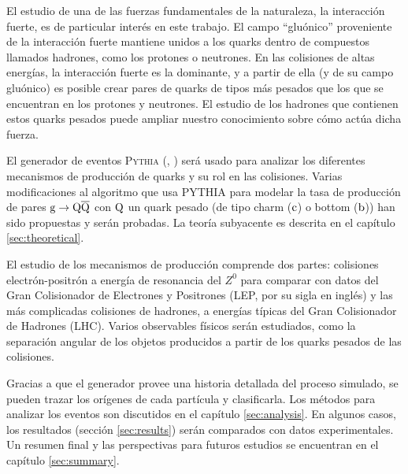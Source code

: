 El estudio de una de las fuerzas fundamentales de la naturaleza, la interacción fuerte, es de particular interés en este trabajo. El campo ``gluónico'' proveniente de la interacción fuerte mantiene unidos a los quarks dentro de compuestos llamados hadrones, como los protones o neutrones. En las colisiones de altas energías, la interacción fuerte es la dominante, y a partir de ella (y de su campo gluónico) es posible crear pares de quarks de tipos más pesados que los que se encuentran en los protones y neutrones. El estudio de los hadrones que contienen estos quarks pesados puede ampliar nuestro conocimiento sobre cómo actúa dicha fuerza.

El generador de eventos \textsc{Pythia} (\cite{Sjostrand:2006za}, \cite{Sjostrand:2007gs}) será usado para analizar los diferentes mecanismos de producción de quarks y su rol en las colisiones. Varias modificaciones al algoritmo que usa PYTHIA para modelar la tasa de producción de pares ${\mathrm g}\to{\mathrm Q}\overline{\mathrm Q}$ con ${\mathrm Q}$ un quark pesado (de tipo charm (${\mathrm c}$) o bottom (${\mathrm b}$)) han sido propuestas y serán probadas. La teoría subyacente es descrita en el capítulo \ref{sec:theoretical}.

El estudio de los mecanismos de producción comprende dos partes: colisiones electrón-positrón a energía de resonancia del $Z^0$ para comparar con datos del Gran Colisionador de Electrones y Positrones (LEP, por su sigla en inglés) y las más complicadas colisiones de hadrones, a energías típicas del Gran Colisionador de Hadrones (LHC). Varios observables físicos serán estudiados, como la separación angular de los objetos producidos a partir de los quarks pesados de las colisiones.

Gracias a que el generador provee una historia detallada del proceso simulado, se pueden trazar los orígenes de cada partícula y clasificarla. Los métodos para analizar los eventos son discutidos en el capítulo \ref{sec:analysis}. En algunos casos, los resultados (sección \ref{sec:results}) serán comparados con datos experimentales. Un resumen final y las perspectivas para futuros estudios se encuentran en el capítulo \ref{sec:summary}.



